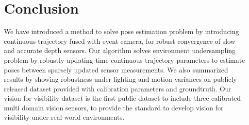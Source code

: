 \section{Conclusion}

We have introduced a method to solve pose estimation problem by introducing continuous
trajectory fused with event camera, for robust convergence of slow and accurate depth sensors.
Our algorithm solves environment undersampling problem by robustly updating time-continuous
trajectory parameters to estimate poses between sparsely updated sensor measurements.
We also summarized results by showing robustness under lighting and motion variances on publicly
released dataset provided with calibration parameters and groundtruth. Our vision for visibility dataset
is the first public dataset to include three calibrated multi domain vision sensors, to provide
the standard to develop vision for visibility under real-world environments.